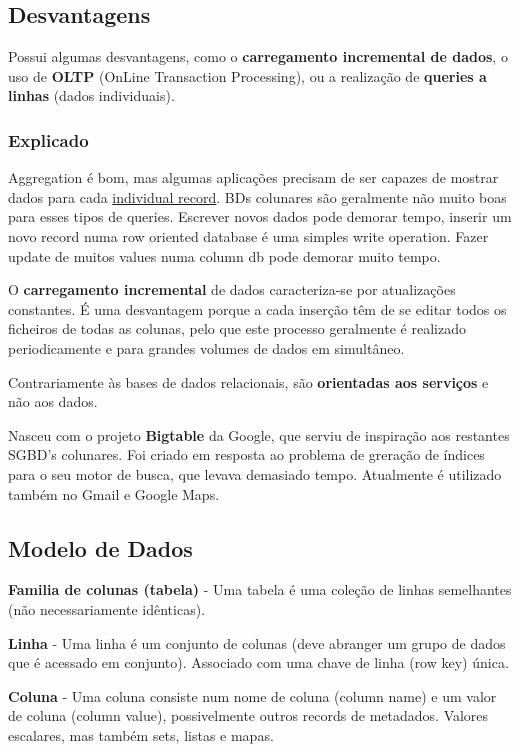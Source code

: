\documentclass{article}
\begin{document}
\subsection{Desvantagens}
Possui algumas desvantagens, como o \textbf{carregamento incremental de dados}, o uso de \textbf{OLTP}
(OnLine Transaction Processing), ou a realização de \textbf{queries a linhas} (dados individuais).

\subsubsection{Explicado}

Aggregation é bom, mas algumas aplicações precisam de ser capazes de mostrar dados para
cada \uline{individual record}. BDs colunares são geralmente não muito boas para esses tipos de queries.
Escrever novos dados pode demorar tempo, inserir um novo record numa row oriented database é uma simples
write operation. Fazer update de muitos values numa column db pode demorar muito tempo.

\vspace{2mm}

O \textbf{carregamento incremental} de dados caracteriza-se por atualizações constantes. É uma desvantagem porque a cada
inserção têm de se editar todos os ficheiros de todas as colunas, pelo que este processo geralmente é realizado
periodicamente e para grandes volumes de dados em simultâneo.

\vspace{2mm}

Contrariamente às bases de dados relacionais, são \textbf{orientadas aos serviços}
e não aos dados.

\vspace{2mm}

Nasceu com o projeto \textbf{Bigtable} da Google, que serviu de inspiração
aos restantes SGBD's colunares. Foi criado em resposta ao problema de greração
de índices para o seu motor de busca, que levava demasiado tempo.
Atualmente é utilizado também no Gmail e Google Maps.

\pagebreak

\subsection{Modelo de Dados}

\begin{flushleft}
  \textbf{Familia de colunas (tabela)} - Uma tabela é uma coleção de linhas semelhantes
  (não necessariamente idênticas).

  \textbf{Linha} - Uma linha é um conjunto de colunas (deve abranger um grupo de dados
  que é acessado em conjunto).
  Associado com uma chave de linha (row key) única.

  \textbf{Coluna} - Uma coluna consiste num nome de coluna (column name)
  e um valor de coluna (column value), possivelmente outros records de metadados.
  Valores escalares, mas também sets, listas e mapas.
\end{flushleft}
\end{document}
